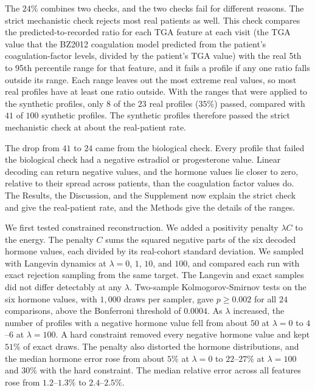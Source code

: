 \documentclass[
  11pt,
  letterpaper,
]{article}
\begin{document}
The \(24\%\) combines two checks, and the two checks fail for different
reasons. The strict mechanistic check rejects most real patients as
well. This check compares the predicted-to-recorded ratio for each TGA
feature at each visit (the TGA value that the BZ2012 coagulation model
predicted from the patient's coagulation-factor levels, divided by the
patient's TGA value) with the real 5th to 95th percentile range for that
feature, and it fails a profile if any one ratio falls outside its
range. Each range leaves out the most extreme real values, so most real
profiles have at least one ratio outside. With the ranges that were
applied to the synthetic profiles, only \(8\) of the \(23\) real
profiles (\(35\%\)) passed, compared with \(41\) of \(100\) synthetic
profiles. The synthetic profiles therefore passed the strict mechanistic
check at about the real-patient rate.

The drop from \(41\) to \(24\) came from the biological check. Every
profile that failed the biological check had a negative estradiol or
progesterone value. Linear decoding can return negative values, and the
hormone values lie closer to zero, relative to their spread across
patients, than the coagulation factor values do. The Results, the
Discussion, and the Supplement now explain the strict check and give the
real-patient rate, and the Methods give the details of the ranges.

We first tested constrained reconstruction. We added a positivity
penalty \(\lambda C\) to the energy. The penalty \(C\) sums the squared
negative parts of the six decoded hormone values, each divided by its
real-cohort standard deviation. We sampled with Langevin dynamics at
\(\lambda=0\), \(1\), \(10\), and \(100\), and compared each run with
exact rejection sampling from the same target. The Langevin and exact
samples did not differ detectably at any \(\lambda\). Two-sample
Kolmogorov-Smirnov tests on the six hormone values, with \(1{,}000\)
draws per sampler, gave \(p\ge0.002\) for all \(24\) comparisons, above
the Bonferroni threshold of \(0.0004\). As \(\lambda\) increased, the
number of profiles with a negative hormone value fell from about \(50\)
at \(\lambda=0\) to \(4\)--\(6\) at \(\lambda=100\). A hard constraint
removed every negative hormone value and kept \(51\%\) of exact draws.
The penalty also distorted the hormone distributions, and the median
hormone error rose from about \(5\%\) at \(\lambda=0\) to
\(22\)--\(27\%\) at \(\lambda=100\) and \(30\%\) with the hard
constraint. The median relative error across all features rose from
\(1.2\)--\(1.3\%\) to \(2.4\)--\(2.5\%\).
\end{document}
